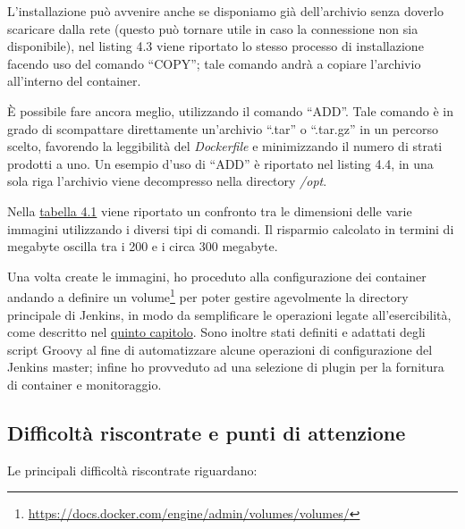 L'installazione può avvenire anche se disponiamo già dell'archivio senza doverlo scaricare dalla rete (questo può tornare utile in caso la connessione non sia disponibile), nel listing 4.3 viene riportato lo stesso processo di installazione facendo uso del comando ``COPY''; tale comando andrà a copiare l'archivio all'interno del container.

  

\`E possibile fare ancora meglio, utilizzando il comando ``ADD''. Tale comando è in grado di scompattare direttamente un'archivio ``.tar'' o ``.tar.gz'' in un percorso scelto, favorendo la leggibilità del \textit{Dockerfile} e minimizzando il numero di strati prodotti a uno. Un esempio d'uso di ``ADD'' è riportato nel listing 4.4, in una sola riga l'archivio viene decompresso nella directory \textit{/opt}.

  

Nella \hyperref[tab:dim]{tabella 4.1} viene riportato un confronto tra le dimensioni delle varie immagini utilizzando i diversi tipi di comandi. Il risparmio calcolato in termini di megabyte oscilla tra i 200 e i circa 300 megabyte.



Una volta create le immagini, ho proceduto alla configurazione dei \gls{container} andando a definire un volume\footnote{\url{https://docs.docker.com/engine/admin/volumes/volumes/}} per poter gestire agevolmente la directory principale di Jenkins, in modo da semplificare le operazioni legate all'esercibilità, come descritto nel \hyperref[cap:esercibilità]{quinto capitolo}. Sono inoltre stati definiti e adattati degli script Groovy al fine di automatizzare alcune operazioni di configurazione del Jenkins \gls{master}; infine ho provveduto ad una selezione di \gls{plugin} per la fornitura di \gls{container} e monitoraggio. 

\subsection{Difficoltà riscontrate e punti di attenzione}

Le principali difficoltà riscontrate riguardano:

